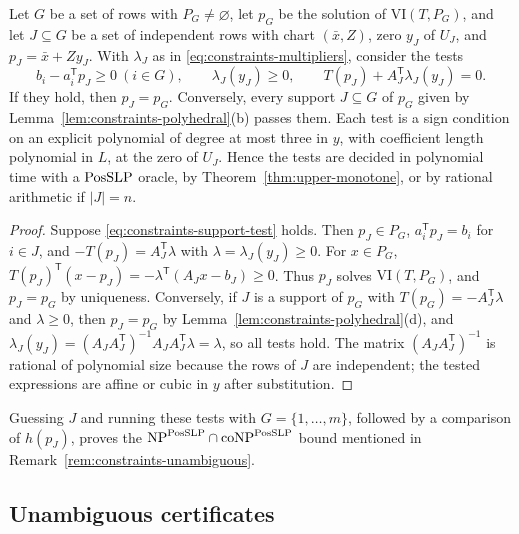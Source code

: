 \begin{lemma}
\label{lem:constraints-support-test}
Let $G$ be a set of rows with $P_G\ne\varnothing$, let $p_G$ be the solution of
$\mathrm{VI}(T,P_G)$, and let $J\subseteq G$ be a set of independent rows with
chart $(\bar x,Z)$, zero $y_J$ of $U_J$, and $p_J=\bar x+Zy_J$. With
$\lambda_J$ as in \eqref{eq:constraints-multipliers}, consider the tests
\begin{equation}\label{eq:constraints-support-test}
 b_i-a_i^{\mathsf T}p_J\ge0\ (i\in G),\qquad \lambda_J(y_J)\ge0,\qquad
 T(p_J)+A_J^{\mathsf T}\lambda_J(y_J)=0 .
\end{equation}
If they hold, then $p_J=p_G$. Conversely, every support $J\subseteq G$ of
$p_G$ given by Lemma~\ref{lem:constraints-polyhedral}(b) passes them. Each
test is a sign condition on an explicit polynomial of degree at most three in
$y$, with coefficient length polynomial in $L$, at the zero of $U_J$.
Hence the tests are decided in polynomial time with a $\mathrm{PosSLP}$ oracle, by
Theorem~\ref{thm:upper-monotone}, or by rational arithmetic if $|J|=n$.
\end{lemma}

\begin{proof}
Suppose \eqref{eq:constraints-support-test} holds. Then $p_J\in P_G$,
$a_i^{\mathsf T}p_J=b_i$ for $i\in J$, and $-T(p_J)=A_J^{\mathsf T}\lambda$ with
$\lambda=\lambda_J(y_J)\ge0$. For $x\in P_G$,
$T(p_J)^{\mathsf T}(x-p_J)=-\lambda^{\mathsf T}(A_Jx-b_J)\ge0$. Thus $p_J$
solves $\mathrm{VI}(T,P_G)$, and $p_J=p_G$ by uniqueness. Conversely, if $J$
is a support of $p_G$ with $T(p_G)=-A_J^{\mathsf T}\lambda$ and $\lambda\ge0$,
then $p_J=p_G$ by Lemma~\ref{lem:constraints-polyhedral}(d), and
$\lambda_J(y_J)=(A_JA_J^{\mathsf T})^{-1}A_JA_J^{\mathsf T}\lambda=\lambda$,
so all tests hold. The matrix $(A_JA_J^{\mathsf T})^{-1}$ is rational of
polynomial size because the rows of $J$ are independent; the tested
expressions are affine or cubic in $y$ after substitution.
\end{proof}

Guessing $J$ and running these tests with $G=\{1,\ldots,m\}$, followed by a
comparison of $h(p_J)$, proves the
$\mathrm{NP}^{\mathrm{PosSLP}}\cap\mathrm{coNP}^{\mathrm{PosSLP}}$ bound mentioned in
Remark~\ref{rem:constraints-unambiguous}.

\subsection{Unambiguous certificates}
\label{app:constraints-unambiguous}

